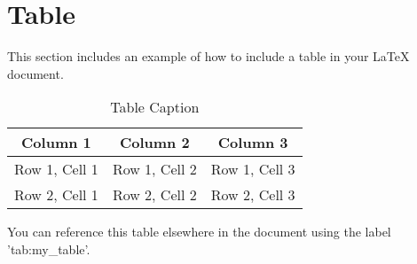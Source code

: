 \section{Table}
\label{sec:table} 

This section includes an example of how to include a table in your LaTeX document.


\begin{table}[ht]
    \centering
    \caption{Table Caption}
    \label{tab:my_table}
    \begin{tabular}{|c|c|c|}
        \hline
        \textbf{Column 1} & \textbf{Column 2} & \textbf{Column 3} \\
        \hline
        Row 1, Cell 1 & Row 1, Cell 2 & Row 1, Cell 3 \\
        \hline
        Row 2, Cell 1 & Row 2, Cell 2 & Row 2, Cell 3 \\
        \hline
    \end{tabular}
\end{table}

You can reference this table elsewhere in the document using the label 'tab:my\_table'.

